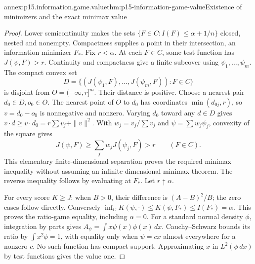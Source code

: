 \begin{annexitem}{annex:p15.information.game.value}{thm:p15-information-game-value}{Existence of minimizers and the exact minimax value}
\begin{proof}
Lower semicontinuity makes the sets
\(\{F\in C:I(F)\leq\alpha+1/n\}\) closed, nested and nonempty.
Compactness supplies a point in their intersection, an information
minimizer \(F_*\).
Fix \(r<\alpha\). At each \(F\in C\), some test function has
\(J(\psi,F)>r\). Continuity and compactness give a finite subcover
using \(\psi_1,\ldots,\psi_m\).
The compact convex set
\[
 D=\{(J(\psi_1,F),\ldots,J(\psi_m,F)):F\in C\}
\]
is disjoint from \(O=(-\infty,r]^m\). Their distance is positive.
Choose a nearest pair \(d_0\in D,o_0\in O\). The nearest point of
\(O\) to \(d_0\) has coordinates \(\min(d_{0j},r)\), so
\(v=d_0-o_0\) is nonnegative and nonzero.
Varying \(d_0\) toward any \(d\in D\) gives
\(v\cdot d\geq v\cdot d_0=r\sum v_j+\|v\|^2\).
With \(w_j=v_j/\sum v_j\) and \(\psi=\sum w_j\psi_j\), convexity
of the square gives
\[
 J(\psi,F)\geq\sum_jw_jJ(\psi_j,F)>r\qquad(F\in C).
\]
This elementary finite-dimensional separation proves the required
minimax inequality without assuming an infinite-dimensional minimax
theorem. The reverse inequality follows by evaluating at \(F_*\).
Let \(r\uparrow\alpha\).

For every score \(K\geq J\): when \(B>0\), their difference is
\((A-B)^2/B\); the zero cases follow directly. Conversely
\(\inf_C K(\psi,\cdot)\leq K(\psi,F_*)\leq I(F_*)=\alpha\).
This proves the ratio-game equality, including \(\alpha=0\).
For a standard normal density \(\phi\), integration by parts gives
\(A_\psi=\int x\psi(x)\phi(x)\,dx\).
Cauchy--Schwarz bounds its ratio by \(\int x^2\phi=1\), with equality
only when \(\psi=cx\) almost everywhere for a nonzero \(c\).
No such function has compact support. Approximating \(x\) in
\(L^2(\phi\,dx)\) by test functions gives the value one.
\end{proof}
\end{annexitem}

